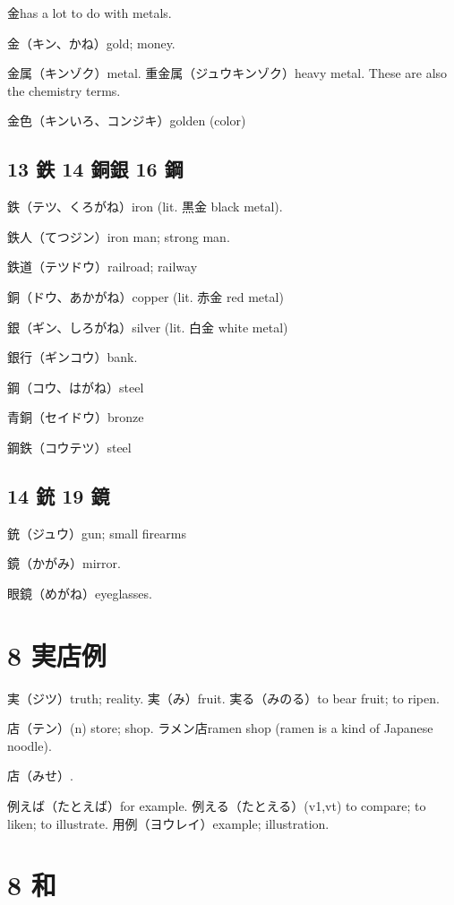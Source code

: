 金has a lot to do with metals.

金（キン、かね）gold; money.

金属（キンゾク）metal.
重金属（ジュウキンゾク）heavy metal.
These are also the chemistry terms.

金色（キンいろ、コンジキ）golden (color)

\subsection{13 鉄 14 銅銀 16 鋼}

鉄（テツ、くろがね）iron (lit. 黒金 black metal).

鉄人（てつジン）iron man; strong man.

鉄道（テツドウ）railroad; railway

銅（ドウ、あかがね）copper (lit. 赤金 red metal)

銀（ギン、しろがね）silver (lit. 白金 white metal)

銀行（ギンコウ）bank.

鋼（コウ、はがね）steel

青銅（セイドウ）bronze

鋼鉄（コウテツ）steel

\subsection{14 銃 19 鏡}

銃（ジュウ）gun; small firearms

鏡（かがみ）mirror.

眼鏡（めがね）eyeglasses.

\section{8 実店例}

実（ジツ）truth; reality.
実（み）fruit.
実る（みのる）to bear fruit; to ripen.

店（テン）(n) store; shop.
ラメン店ramen shop (ramen is a kind of Japanese noodle).

店（みせ）.

例えば（たとえば）for example.
例える（たとえる）(v1,vt)
to compare; to liken; to illustrate.
用例（ヨウレイ）example; illustration.

\section{8 和}

